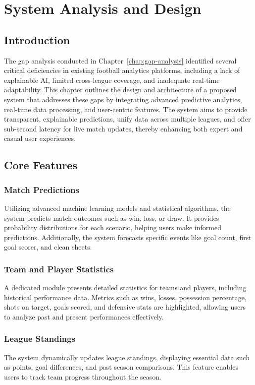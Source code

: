 \chapter{System Analysis and Design}
\label{chap:system-analysis-and-design}

\section{Introduction}
The gap analysis conducted in Chapter~\ref{chap:gap-analysis} identified several critical deficiencies in existing football analytics platforms, including a lack of explainable AI, limited cross-league coverage, and inadequate real-time adaptability. This chapter outlines the design and architecture of a proposed system that addresses these gaps by integrating advanced predictive analytics, real-time data processing, and user-centric features. The system aims to provide transparent, explainable predictions, unify data across multiple leagues, and offer sub-second latency for live match updates, thereby enhancing both expert and casual user experiences.

\section{Core Features}

\subsection{Match Predictions}
Utilizing advanced machine learning models and statistical algorithms, the system predicts match outcomes such as win, loss, or draw. It provides probability distributions for each scenario, helping users make informed predictions. Additionally, the system forecasts specific events like goal count, first goal scorer, and clean sheets.

\subsection{Team and Player Statistics}
A dedicated module presents detailed statistics for teams and players, including historical performance data. Metrics such as wins, losses, possession percentage, shots on target, goals scored, and defensive stats are highlighted, allowing users to analyze past and present performances effectively.

\subsection{League Standings}
The system dynamically updates league standings, displaying essential data such as points, goal differences, and past season comparisons. This feature enables users to track team progress throughout the season.

